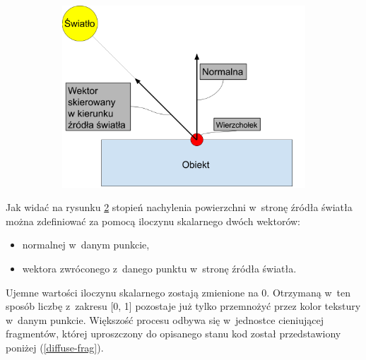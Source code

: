 \documentclass[a4paper,twoside,12pt]{book}
\begin{document}
\begin{itemize}
\begin{figure}[H]
\begin{subfigure}[b]{0.4\textwidth}
            \label{fig:diffuse_brightness}
        \end{subfigure}
        ~ %
        \begin{subfigure}[b]{0.5\textwidth}
            \includegraphics[width=\textwidth]{res/diffuse_vectors.png}
            \label{fig:diffuse_vectors}
        \end{subfigure}
        \label{fig:diffuse}
    \end{figure}
    Jak widać na rysunku \ref{fig:diffuse_vectors} stopień nachylenia powierzchni w~stronę źródła światła można zdefiniować za pomocą iloczynu skalarnego dwóch wektorów:
    \begin{itemize}
        \item normalnej w~danym punkcie,
        \item wektora zwróconego z~danego punktu w~stronę źródła światła.
    \end{itemize}
    Ujemne wartości iloczynu skalarnego zostają zmienione na 0. Otrzymaną w~ten sposób liczbę z~zakresu [0, 1] pozostaje już tylko przemnożyć przez kolor tekstury w~danym punkcie. Większość procesu odbywa się w~jednostce cieniującej fragmentów, której uproszczony do opisanego stanu kod został przedstawiony poniżej (\ref{diffuse-frag}).
    

\end{itemize}
\end{document}
